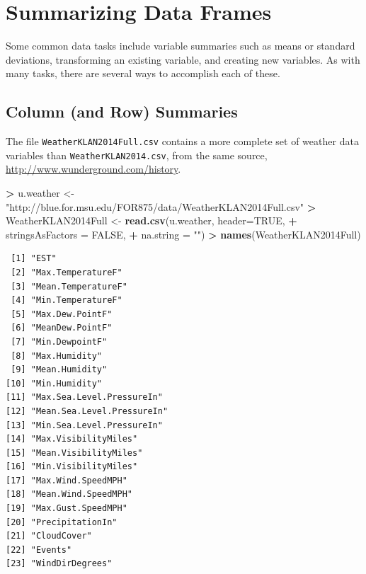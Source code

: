 \documentclass[]{krantz}
\makeatletter
\newenvironment{Shaded}{\begin{snugshade}}{\end{snugshade}}
\newcommand{\KeywordTok}[1]{\textcolor[rgb]{0.27,0.27,0.27}{\textbf{#1}}}
\newcommand{\DataTypeTok}[1]{\textcolor[rgb]{0.27,0.27,0.27}{#1}}
\newcommand{\StringTok}[1]{\textcolor[rgb]{0.5,0.5,0.5}{#1}}
\newcommand{\OtherTok}[1]{\textcolor[rgb]{0.37,0.37,0.37}{#1}}
\newcommand{\OperatorTok}[1]{\textcolor[rgb]{0.43,0.43,0.43}{\textbf{#1}}}
\newcommand{\NormalTok}[1]{#1}
\newenvironment{kframe}{%
\medskip{}
\setlength{\fboxsep}{.8em}
 \def\at@end@of@kframe{}%
 \ifinner\ifhmode%
  \def\at@end@of@kframe{\end{minipage}}%
  \begin{minipage}{\columnwidth}%
 \fi\fi%
 \def\FrameCommand##1{\hskip\@totalleftmargin \hskip-\fboxsep
 \colorbox{shadecolor}{##1}\hskip-\fboxsep
     \hskip-\linewidth \hskip-\@totalleftmargin \hskip\columnwidth}%
 \MakeFramed {\advance\hsize-\width
   \@totalleftmargin\z@ \linewidth\hsize
   \@setminipage}}%
 {\par\unskip\endMakeFramed%
 \at@end@of@kframe}
\renewenvironment{Shaded}{\begin{kframe}}{\end{kframe}}
\makeatother
\begin{document}
\section{Summarizing Data Frames}\label{summarizing-data-frames}

Some common data tasks include variable summaries such as means or
standard deviations, transforming an existing variable, and creating new
variables. As with many tasks, there are several ways to accomplish each
of these.

\subsection{Column (and Row) Summaries}\label{column-and-row-summaries}

The file \texttt{WeatherKLAN2014Full.csv} contains a more complete set
of weather data variables than \texttt{WeatherKLAN2014.csv}, from the
same source, \url{http://www.wunderground.com/history}.

\begin{Shaded}
\begin{Highlighting}[]
\OperatorTok{>}\StringTok{ }\NormalTok{u.weather <-}\StringTok{ "http://blue.for.msu.edu/FOR875/data/WeatherKLAN2014Full.csv"}
\OperatorTok{>}\StringTok{ }\NormalTok{WeatherKLAN2014Full <-}\StringTok{ }\KeywordTok{read.csv}\NormalTok{(u.weather, }\DataTypeTok{header=}\OtherTok{TRUE}\NormalTok{, }
\OperatorTok{+}\StringTok{                                }\DataTypeTok{stringsAsFactors =} \OtherTok{FALSE}\NormalTok{, }
\OperatorTok{+}\StringTok{                                }\DataTypeTok{na.string =} \StringTok{""}\NormalTok{)}
\OperatorTok{>}\StringTok{ }\KeywordTok{names}\NormalTok{(WeatherKLAN2014Full)}
\end{Highlighting}
\end{Shaded}

\begin{verbatim}
 [1] "EST"                      
 [2] "Max.TemperatureF"         
 [3] "Mean.TemperatureF"        
 [4] "Min.TemperatureF"         
 [5] "Max.Dew.PointF"           
 [6] "MeanDew.PointF"           
 [7] "Min.DewpointF"            
 [8] "Max.Humidity"             
 [9] "Mean.Humidity"            
[10] "Min.Humidity"             
[11] "Max.Sea.Level.PressureIn" 
[12] "Mean.Sea.Level.PressureIn"
[13] "Min.Sea.Level.PressureIn" 
[14] "Max.VisibilityMiles"      
[15] "Mean.VisibilityMiles"     
[16] "Min.VisibilityMiles"      
[17] "Max.Wind.SpeedMPH"        
[18] "Mean.Wind.SpeedMPH"       
[19] "Max.Gust.SpeedMPH"        
[20] "PrecipitationIn"          
[21] "CloudCover"               
[22] "Events"                   
[23] "WindDirDegrees"           
\end{verbatim}
\end{document}

